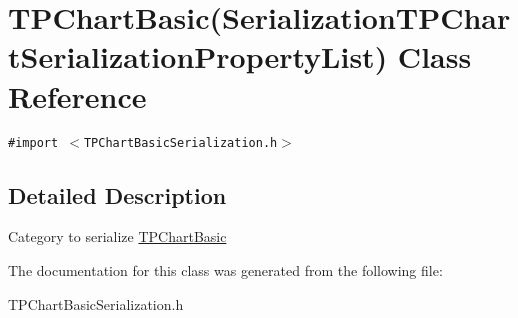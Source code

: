 \hypertarget{interface_t_p_chart_basic_07_serialization_t_p_chart_serialization_property_list_08}{
\section{TPChartBasic(SerializationTPChartSerializationPropertyList) Class Reference}
\label{interface_t_p_chart_basic_07_serialization_t_p_chart_serialization_property_list_08}
}
{\tt \#import $<$TPChartBasicSerialization.h$>$}



\subsection{Detailed Description}
Category to serialize \hyperlink{interface_t_p_chart_basic}{TPChartBasic} 

The documentation for this class was generated from the following file:\begin{CompactItemize}
\item 
TPChartBasicSerialization.h\end{CompactItemize}
